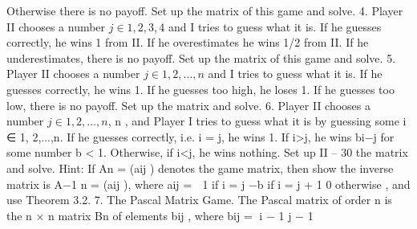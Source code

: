 Otherwise there is no payoff. Set up the matrix of this game and solve.
4. Player II chooses a number $j \in {1, 2, 3, 4}$ and I tries to guess what it is. If
he guesses correctly, he wins 1 from II. If he overestimates he wins 1/2 from II. If he
underestimates, there is no payoff. Set up the matrix of this game and solve.
5. Player II chooses a number $j \in {1, 2,\ldots,n}$ and I tries to guess what it is. If he
guesses correctly, he wins 1. If he guesses too high, he loses 1. If he guesses too low, there
is no payoff. Set up the matrix and solve.
6. Player II chooses a number $j \in {1, 2,\ldots,n}$, n , and Player I tries to guess
what it is by guessing some i ∈ {1, 2,...,n}. If he guesses correctly, i.e. i = j, he wins 1.
If i>j, he wins bi−j for some number b < 1. Otherwise, if i<j, he wins nothing. Set up
II – 30
the matrix and solve. Hint: If An = (aij ) denotes the game matrix, then show the inverse
matrix is A−1
n = (aij ), where aij =
 1 if i = j
−b if i = j + 1
0 otherwise
, and use Theorem 3.2.
7. The Pascal Matrix Game. The Pascal matrix of order n is the n × n matrix
Bn of elements bij , where
bij =
i − 1
j − 1

